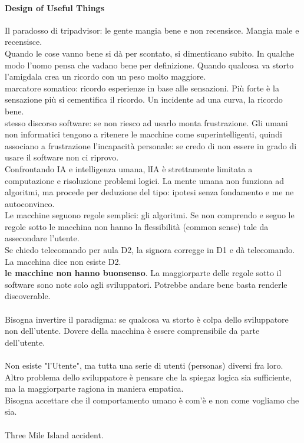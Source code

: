 \documentclass[10pt]{article}
\begin{document}
\paragraph{Design of Useful Things} Il paradosso di tripadvisor: le gente mangia bene e non recensisce. Mangia male e recensisce.\\
Quando le cose vanno bene si dà per scontato, si dimenticano subito. In qualche modo l'uomo pensa che vadano bene per definizione. Quando qualcosa va storto l'amigdala crea un ricordo con un peso molto maggiore.\\
marcatore somatico: ricordo esperienze in base alle sensazioni. Più forte è la sensazione più si cementifica il ricordo. Un incidente ad una curva, la ricordo bene.\\
stesso discorso software: se non riesco ad usarlo monta frustrazione. Gli umani non informatici tengono a ritenere le macchine come superintelligenti, quindi associano a frustrazione l'incapacità personale: se credo di non essere in grado di usare il software non ci riprovo.\\
Confrontando IA e intelligenza umana, lIA è strettamente limitata a computazione e risoluzione problemi logici. La mente umana non funziona ad algoritmi, ma procede per deduzione del tipo: ipotesi senza fondamento e me ne autoconvinco.\\
Le macchine seguono regole semplici: gli algoritmi. Se non comprendo e seguo le regole sotto le macchina non hanno la flessibilità (common sense) tale da assecondare l'utente.\\
Se chiedo telecomando per aula D2, la signora corregge in D1 e dà telecomando. La macchina dice non esiste D2.\\
\textbf{le macchine non hanno buonsenso}. La maggiorparte delle regole sotto il software sono note solo agli sviluppatori. Potrebbe andare bene basta renderle discoverable.\\\\
Bisogna invertire il paradigma: se qualcosa va storto è colpa dello sviluppatore non dell'utente. Dovere della macchina è essere comprensibile da parte dell'utente.\\\\
Non esiste "l'Utente", ma tutta una serie di utenti (personas) diversi fra loro.\\
Altro problema dello sviluppatore è pensare che la spiegaz logica sia sufficiente, ma la maggiorparte ragiona in maniera empatica.\\
Bisogna accettare che il comportamento umano è com'è e non come vogliamo che sia.\\\\
Three Mile Island accident.\\
\end{document}

